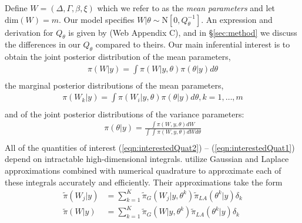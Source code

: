 \documentclass[]{article}
\begin{document}
Define $W = \left(\Delta, \Gamma,\beta, \xi \right)$ which we refer to as the \textit{mean parameters} and let $\text{dim}(W) = m$. Our model specifies $W|\theta\sim\text{N}\left[ 0,Q^{-1}_{\theta}\right]$. An expression and derivation for $Q_{\theta}$ is given by \citet{casecross} (Web Appendix C), and in \S\ref{sec:method} we discuss the differences in our $Q_{\theta}$ compared to theirs. Our main inferential interest is to obtain the joint posterior distribution of the mean parameters,
\begin{equation}\begin{aligned}\label{eqn:interestedQuat2}
\pi(W|y) = \int \pi(W|y,\theta) \pi(\theta|y) d\theta  \\
\end{aligned}\end{equation}
the marginal posterior distributions of the mean parameters,
\begin{equation}\begin{aligned}\label{eqn:interestedQuat3}
\pi(W_{k}|y) = \int \pi(W_i|y,\theta) \pi(\theta|y) d\theta, k = 1,\ldots,m  \\
\end{aligned}\end{equation}
and of the joint posterior distributions of the variance parameters:
\begin{equation}\begin{aligned}\label{eqn:interestedQuat1}
\pi(\theta|y) = \frac{\int \pi(W,y,\theta) dW}{\int_{} \int_{} \pi(W,y,\theta) dW d\theta } \\
\end{aligned}\end{equation}
All of the quantities of interest (\ref{eqn:interestedQuat2}) -- (\ref{eqn:interestedQuat1}) depend on intractable high-dimensional integrals. \citet{casecross} utilize Gaussian and Laplace approximations combined with numerical quadrature to approximate each of these integrals accurately and efficiently. Their approximations take the form
\begin{equation}\begin{aligned}\label{eqn:integration}
\tilde{\pi}(W_{j}|y) &= \sum_{k=1}^{K}
\tilde{\pi}_{G}(W_{j}|y,\theta^{k})
\tilde{\pi}_{LA}(\theta^{k}|y)\delta_{k} \\
\tilde{\pi}(W|y) &= \sum_{k=1}^{K}
\tilde{\pi}_{G}(W|y,\theta^{k})
\tilde{\pi}_{LA}(\theta^{k}|y)\delta_{k} \\
\end{aligned}\end{equation}
\end{document}
